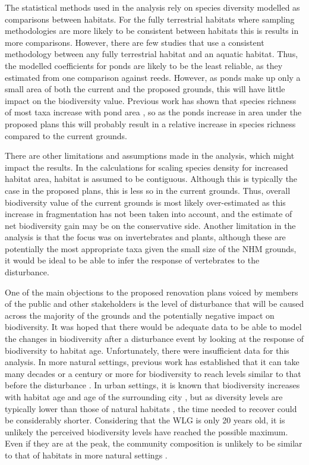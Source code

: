 The statistical methods used in the analysis rely on species diversity modelled as comparisons between habitats. For the fully terrestrial habitats where sampling methodologies are more likely to be consistent between habitats this is results in more comparisons. However, there are few studies that use a consistent methodology between any fully terrestrial habitat and an aquatic habitat. Thus, the modelled coefficients for ponds are likely to be the least reliable, as they estimated from one comparison against reeds. However, as ponds make up only a small area of both the current and the proposed grounds, this will have little impact on the biodiversity value. Previous work has shown that species richness of most taxa increase with pond area \citep{Oertli:2002bc; Parris:2006jae}, so as the ponds increase in area under the proposed plans this will probably result in a relative increase in species richness compared to the current grounds.

There are other limitations and assumptions made in the analysis, which might impact the results.  In the calculations for scaling species density for increased habitat area, habitat is assumed to be contiguous. Although this is typically the case in the proposed plans, this is less so in the current grounds. Thus, overall biodiversity value of the current grounds is most likely over-estimated as this increase in fragmentation has not been taken into account, and the estimate of net biodiversity gain may be on the conservative side.  Another limitation in the analysis is that the focus was on invertebrates and plants, although these are potentially the most appropriate taxa given the small size of the NHM grounds, it would be ideal to be able to infer the response of vertebrates to the disturbance.

One of the main objections to the proposed renovation plans voiced by members of the public and other stakeholders is the level of disturbance that will be caused across the majority of the grounds and the potentially negative impact on biodiversity. It was hoped that there would be adequate data to be able to model the changes in biodiversity after a disturbance event by looking at the response of biodiversity to habitat age. Unfortunately, there were insufficient data for this analysis.  In more natural settings, previous work has established that it can take many decades \citep{Hirst:2005jae} or a century or more \citep{Vellend:2006ecol} for biodiversity to reach levels similar to that before the disturbance . In urban settings, it is known that biodiversity increases with habitat age \citep{Yamaguchi:2004er;Sattler:2010le} and age of the surrounding city \citep{Aronson:2014procb}, but as diversity levels are typically lower than those of natural habitats \citep{Bates:2011po; Ockinger:2009lup}, the time needed to recover could be considerably shorter. Considering that the WLG is only 20 years old, it is unlikely the perceived biodiversity levels have reached the possible maximum. Even if they are at the peak, the community composition is unlikely to be similar to that of habitats in more natural settings \citep{Angold:2006ste}. 

